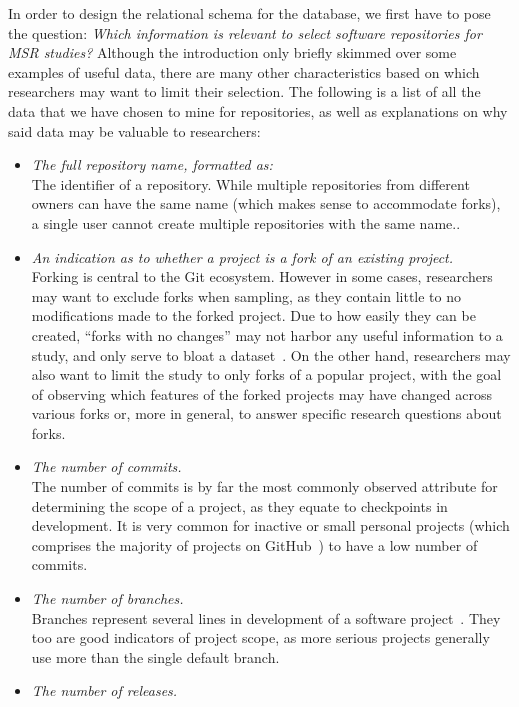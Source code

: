 In order to design the relational schema for the database, we first have to pose the question: \emph{Which information is relevant to select software repositories for MSR studies?}
Although the introduction only briefly skimmed over some examples of useful data, there are many other characteristics based on which researchers may want to limit their selection.
The following is a list of all the data that we have chosen to mine for repositories, as well as explanations on why said data may be valuable to researchers:
\begin{itemize}
    \item \textit{The full repository name, formatted as:} 
    \\The identifier of a repository. While multiple repositories from different owners can have the same name (which makes sense to accommodate forks), a single user cannot create multiple repositories with the same name..
    \item \textit{An indication as to whether a project is a fork of an existing project.}
    \\Forking is central to the Git ecosystem. However in some cases, researchers may want to exclude forks when sampling, as they contain little to no modifications made to the forked project. Due to how easily they can be created, ``forks with no changes'' may not harbor any useful information to a study, and only serve to bloat a dataset~\cite{FORKS}. On the other hand, researchers may also want to limit the study to only forks of a popular project, with the goal of observing which features of the forked projects may have changed across various forks or, more in general, to answer specific research questions about forks.
    \item \textit{The number of commits.}
    \\The number of commits is by far the most commonly observed attribute for determining the scope of a project, as they equate to checkpoints in development. It is very common for inactive or small personal projects (which comprises the majority of projects on GitHub~\cite{COMMITS}) to have a low number of commits.
    \item \textit{The number of branches.}
    \\Branches represent several lines in development of a software project~\cite{GIT}. They too are good indicators of project scope, as more serious projects generally use more than the single default branch.
    \item \textit{The number of releases.}

\end{itemize}
